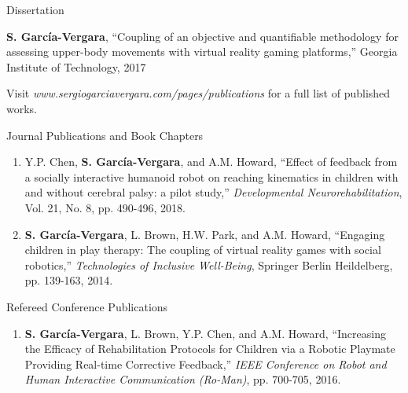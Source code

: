 \documentclass{resume} %
\newcommand{\sectionspace}{\vspace{3mm}}
\newcommand{\Sergio}{\textbf{S. Garc\'{i}a-Vergara}}
\newcommand{\SuperPop}{Super Pop VR\textsuperscript{TM}\space}
\begin{document}
\sectionspace
\begin{rSection}{Dissertation}

  \Sergio, ``Coupling of an objective and quantifiable methodology for
  assessing upper-body movements with virtual reality gaming platforms,''
  Georgia Institute of Technology, 2017

  Visit \textit{www.sergiogarciavergara.com/pages/publications} for a full list
  of published works.

\iffalse

\begin{rSubsection}{Journal Publications and Book Chapters}{}{}{}
\item
\begin{enumerate}

\item Y.P. Chen, \Sergio, and A.M. Howard, ``Effect of feedback from a socially
  interactive humanoid robot on reaching kinematics in children with and without
  cerebral palsy: a pilot study,'' \textit{Developmental Neurorehabilitation},
  Vol. 21, No. 8, pp. 490-496, 2018.


\item \Sergio, L. Brown, H.W. Park, and A.M. Howard, ``Engaging children in play
  therapy: The coupling of virtual reality games with social robotics,''
  \textit{Technologies of Inclusive Well-Being}, Springer Berlin Heildelberg,
  pp. 139-163, 2014.
\end{enumerate}
\end{rSubsection}


\sectionspace

\begin{rSubsection}{Refereed Conference Publications}{}{}{}
\item
\begin{enumerate}

\item \Sergio, L. Brown, Y.P. Chen, and A.M. Howard, ``Increasing the Efficacy
  of Rehabilitation Protocols for Children via a Robotic Playmate Providing
  Real-time Corrective Feedback,'' \textit{IEEE Conference on Robot and Human
    Interactive Communication (Ro-Man)}, pp. 700-705, 2016.


\end{enumerate}
\end{rSubsection}
\end{rSection}
\end{document}
